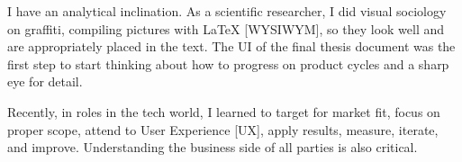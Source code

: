 


I have an analytical inclination. 
As a scientific researcher,
I did visual sociology on graffiti, 
compiling pictures with \LaTeX $ $ {\scriptsize [WYSIWYM]}, 
so they look well and are appropriately placed in the text. 
The UI of the final thesis document was the first step to start thinking about how
to progress on product 
cycles
and a sharp eye for detail.
\smallskip

Recently, in roles in the tech world, I learned to target for market fit, focus on proper
scope, attend to User Experience {\scriptsize[UX]}, apply results, measure, iterate, and improve.
Understanding the business side of all parties is also critical. 
% 
\smallskip



%


